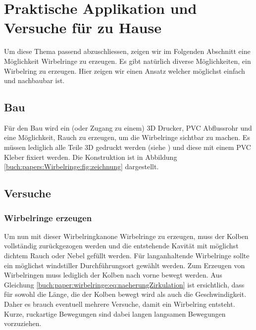 %
%
%
\section{Praktische Applikation und Versuche für zu Hause}

Um diese Thema passend abzuschliessen, zeigen wir im Folgenden Abschnitt eine Möglichkeit Wirbelringe zu erzeugen.
Es gibt natürlich diverse Möglichkeiten, ein Wirbelring zu erzeugen. 
Hier zeigen wir einen Ansatz welcher möglichst einfach und nachbaubar ist.

\subsection{Bau}


Für den Bau wird ein (oder Zugang zu einem) 3D Drucker,  PVC Abflussrohr und eine Möglichkeit, Rauch zu erzeugen, um die Wirbelringe sichtbar zu machen. 
Es müssen lediglich alle Teile 3D gedruckt werden (siehe \cite{Wirbelringe:3D_modelle}) und diese mit einem PVC Kleber fixiert werden. 
Die Konstruktion ist in Abbildung \ref{buch:papers:Wirbelringe:fig:zeichnung} dargestellt.

\subsection{Versuche}

\subsubsection{Wirbelringe erzeugen \label{buch:papers:Wirbelringe:wirbelringeerzeugen}}

Um nun mit dieser Wirbelringkanone Wirbelringe zu erzeugen, muss der Kolben vollständig zurückgezogen werden und die entstehende Kavität mit möglichst dichtem Rauch oder Nebel gefüllt werden.
Für langanhaltende Wirbelringe sollte ein möglichst windstiller Durchführungsort gewählt werden.
Zum Erzeugen von Wirbelringen muss lediglich der Kolben nach vorne bewegt werden.
Aus Gleichung \eqref{buch:paper:wirbelringe:eq:naeherungZirkulation} ist ersichtlich, dass für sowohl die Länge, die der Kolben bewegt wird als auch die Geschwindigkeit.
Daher es brauch eventuell mehrere Versuche, damit ein Wirbelring entsteht.
Kurze, ruckartige Bewegungen sind dabei langen langsamen Bewegungen vorzuziehen.

